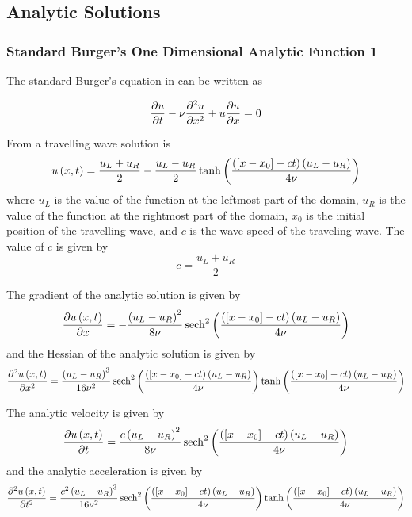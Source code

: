 \subsection{Analytic Solutions}

\subsubsection{Standard Burger's One Dimensional Analytic Function 1}

The \oned standard Burger's equation in \OpenCMISS can be written as

\begin{equation}
  \delby{u}{t}-\nu\deltwosqby{u}{x}+u\delby{u}{x}=0
  \label{eqn:OpenCMISSStandardBurgerEquationOneDim}
\end{equation}

From  a travelling wave solution is
\begin{equation}
   u\left( x,t \right) =\dfrac{u_{L}+u_{R}}{2}-\dfrac{u_{L}-u_{R}}{2}  \tanh\left( \dfrac{\left( \left[ x-x_{0} \right]-ct \right)\left( u_{L}-u_{R} \right)}{4\nu} \right)  
\end{equation}
where $u_{L}$ is the value of the function at the leftmost part of the
domain, $u_{R}$ is the value of the function at the rightmost part of
the domain, $x_{0}$ is the initial position of the travelling wave,
and $c$ is the wave speed of the traveling wave. The value of $c$ is
given by
\begin{equation}
  c=\dfrac{u_{L}+u_{R}}{2}
\end{equation}

The gradient of the analytic solution is given by
\begin{equation}
   \dfrac{\partial  u\left( x,t \right) }{\partial x} =-\dfrac{\left( u_{L}-u_{R} \right)^{2}}{8\nu}  \operatorname{sech}^{2}\left( \dfrac{\left( \left[ x-x_{0} \right]-ct \right)
      \left( u_{L}-u_{R} \right)}{4\nu} \right)  
\end{equation}
and the Hessian of the analytic solution is given by
\begin{equation}
   \dfrac{\partial^{2}  u\left( x,t \right) }{\partial {x}^{2}} =\dfrac{\left( u_{L}-u_{R} \right)^{3}}{16\nu^{2}}  \operatorname{sech}^{2}\left( \dfrac{\left( \left[ x-x_{0} \right]-ct \right)
      \left( u_{L}-u_{R} \right)}{4\nu} \right)    \tanh\left( \dfrac{\left( \left[ x-x_{0} \right]-ct \right)\left( u_{L}-u_{R} \right)}{4\nu} \right)  
\end{equation}

The analytic velocity is given by
\begin{equation}
   \dfrac{\partial  u\left( x,t \right) }{\partial t} =\dfrac{c\left( u_{L}-u_{R} \right)^{2}}{8\nu}  \operatorname{sech}^{2}\left( \dfrac{\left( \left[ x-x_{0} \right]-ct \right)
      \left( u_{L}-u_{R} \right)}{4\nu} \right)  
\end{equation}
and the analytic acceleration is given by
\begin{equation}
   \dfrac{\partial^{2}  u\left( x,t \right) }{\partial {t}^{2}} =\dfrac{c^{2}\left( u_{L}-u_{R} \right)^{3}}{16\nu^{2}}  \operatorname{sech}^{2}\left( \dfrac{\left( \left[ x-x_{0} \right]-ct \right)
      \left( u_{L}-u_{R} \right)}{4\nu} \right)    \tanh\left( \dfrac{\left( \left[ x-x_{0} \right]-ct \right)\left( u_{L}-u_{R} \right)}{4\nu} \right)  
\end{equation}

